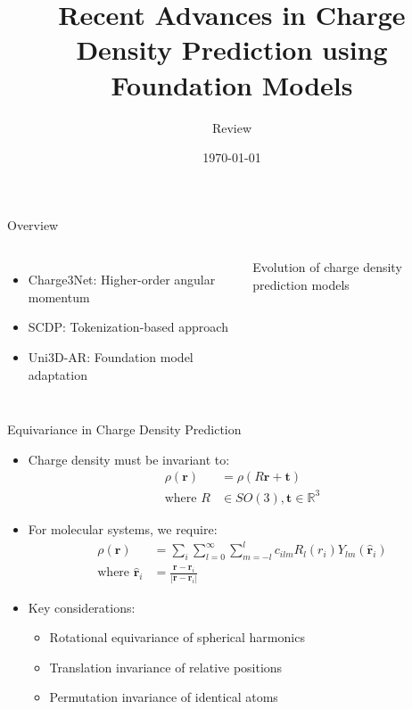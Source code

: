\documentclass[aspectratio=169]{beamer}
\title{Recent Advances in Charge Density Prediction using Foundation Models}
\author{Review}
\date{\today}
\begin{document}
\begin{frame}
    \titlepage
\end{frame}

\begin{frame}{Overview}
    \begin{columns}
        \begin{itemize}
            \item Charge3Net: Higher-order angular momentum
            \item SCDP: Tokenization-based approach
            \item Uni3D-AR: Foundation model adaptation
        \end{itemize}
        Evolution of charge density prediction models
    \end{columns}
\end{frame}

\begin{frame}{Equivariance in Charge Density Prediction}
    \begin{itemize}
        \item Charge density must be invariant to:
        \begin{align*}
            \rho(\mathbf{r}) &= \rho(R\mathbf{r} + \mathbf{t}) \\
            \text{where } R &\in SO(3), \mathbf{t} \in \mathbb{R}^3
        \end{align*}
        \item For molecular systems, we require:
        \begin{align*}
            \rho(\mathbf{r}) &= \sum_{i} \sum_{l=0}^{\infty} \sum_{m=-l}^{l} c_{ilm} R_{l}(r_i)Y_{lm}(\hat{\mathbf{r}}_i) \\
            \text{where } \hat{\mathbf{r}}_i &= \frac{\mathbf{r} - \mathbf{r}_i}{|\mathbf{r} - \mathbf{r}_i|}
        \end{align*}
        \item Key considerations:
        \begin{itemize}
            \item Rotational equivariance of spherical harmonics
            \item Translation invariance of relative positions
            \item Permutation invariance of identical atoms
        \end{itemize}
    \end{itemize}
\end{frame}
\end{document}
